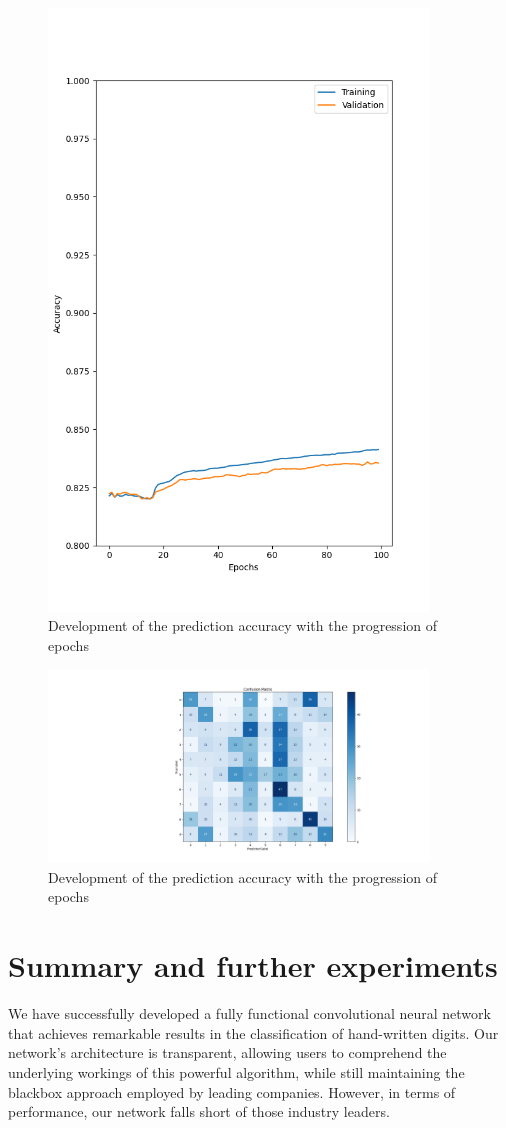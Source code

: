 \documentclass[onecolumn,10pt,cleanfoot]{asme2ej}
\begin{document}
\begin{figure}[H]
  \centering
	\includegraphics[width=0.9\textwidth, height=0.75\textwidth]{cifar10_trainVal_acc.png}
	\caption{Development of the prediction accuracy with the progression of epochs}
  \label{fig:CIFAR_acc}
\end{figure}

\begin{figure}[H]
  \centering
	\includegraphics[width=0.9\textwidth, height=0.75\textwidth]{conf_mat_cifar10.png}
	\caption{Development of the prediction accuracy with the progression of epochs}
  \label{fig:MINST_conf}
\end{figure}

\section{Summary and further experiments}
We have successfully developed a fully functional convolutional neural network that achieves remarkable results in the classification of hand-written digits. Our network's architecture is transparent, allowing users to comprehend the underlying workings of this powerful algorithm, while still maintaining the blackbox approach employed by leading companies. However, in terms of performance, our network falls short of those industry leaders.
\end{document}
